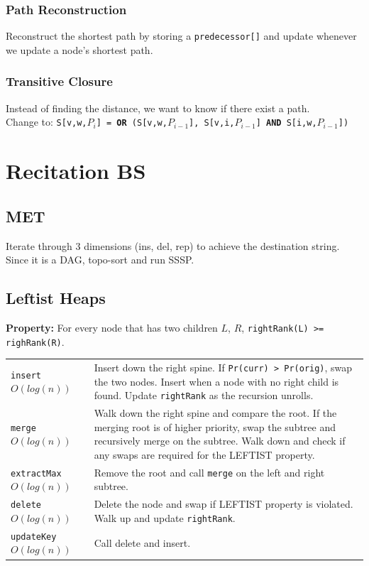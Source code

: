 \documentclass[10pt,landscape,a4paper]{article}
\begin{document}
\begin{multicols*}{4}
\subsubsection{Path Reconstruction}
Reconstruct the shortest path by storing a \texttt{predecessor[]} and update whenever we update a node's shortest path.

\subsubsection{Transitive Closure}
Instead of finding the distance, we want to know if there exist a path. \\
Change to: \texttt{S[v,w,$P_i$] = \textbf{OR} (S[v,w,$P_{i-1}$], S[v,i,$P_{i-1}$] \textbf{AND} S[i,w,$P_{i-1}$])}


\section{Recitation BS}

\subsection{MET}
Iterate through 3 dimensions (ins, del, rep) to achieve the destination string. Since it is a DAG, topo-sort and run SSSP.

\subsection{Leftist Heaps}
\textbf{Property:} For every node that has two children $L$, $R$, \texttt{rightRank(L) >= righRank(R)}.\\
\begin{tabular}{p{1.5cm}p{5cm}}
    \verb!insert! $O(log(n))$   &   Insert down the right spine. If \texttt{Pr(curr) > Pr(orig)}, swap the two nodes. Insert when a node with no right child is found. Update \texttt{rightRank} as the recursion unrolls. \\
    \verb!merge! $O(log(n))$   &   Walk down the right spine and compare the root. If the merging root is of higher priority, swap the subtree and recursively merge on the subtree. Walk down and check if any swaps are required for the LEFTIST property. \\
    \verb!extractMax! $O(log(n))$   &   Remove the root and call \texttt{merge} on the left and right subtree. \\
    \verb!delete! $O(log(n))$   &   Delete the node and swap if LEFTIST property is violated. Walk up and update \texttt{rightRank}. \\
    \verb!updateKey! $O(log(n))$ &  Call delete and insert.


\end{tabular}
\end{multicols*}
\end{document}
